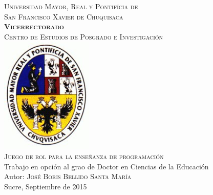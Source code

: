 \documentclass[12pt,letterpaper,titlepage,oneside]{book}
\begin{document}
\begin{titlepage}
\begin{center}
{\LARGE {\textsc{Universidad Mayor, Real y Pontifícia de \\ San Francisco Xavier de Chuquisaca}}} \\ [1.3cm]
{\Large \textsc \textbf{\textsc{Vicerrectorado}}} \\ [1.3cm]
{\Large \textsc{Centro de Estudios de Posgrado e Investigación}} \\ [1.3cm]
\includegraphics[width=4.4cm]{escudo.jpg} \\ [1.3cm]
{\Large {\textsc{Juego de rol para la enseñanza de programación}}} \\[1.3cm]
 {Trabajo en opción al grao de Doctor en Ciencias de la Educación} \\[1.3cm]
{Autor: \textsc{José Boris Bellido Santa María}}\\[1.3cm]
Sucre, Septiembre de 2015
\end{center}
\end{titlepage}
\end{document}
